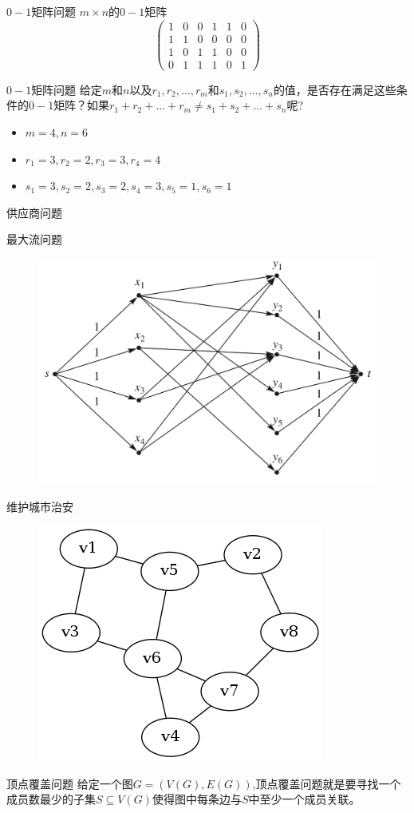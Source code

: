 \documentclass[UTF8]{ctexbeamer}
\begin{document}
\begin{frame}{$0-1$矩阵问题}
  $m \times n$的$0-1$矩阵
  \[
  \left(\begin{array}{cccccc}
    1 & 0 & 0 & 1 & 1 & 0\\
    1 & 1 & 0 & 0 & 0 & 0\\
    1 & 0 & 1 & 1 & 0 & 0\\
    0 & 1 & 1 & 1 & 0 & 1
  \end{array}\right)
  \]
  \begin{block}{$0-1$矩阵问题}
    给定$m$和$n$以及$r_1, r_2,...,r_m$和$s_1, s_2, ..., s_n$的值，是否存在满足这些条件的$0-1$矩阵？如果$r_1+r_2+...+r_m \neq s_1 + s_2 +...+s_n$呢?
  \end{block}

  \begin{itemize}
  \item $m=4, n=6$
  \item $r_1=3, r_2=2, r_3=3, r_4=4$
  \item $s_1=3, s_2=2, s_3=2, s_4=3, s_5=1, s_6=1$
  \end{itemize}
\end{frame}

\begin{frame}{供应商问题}

  最大流问题

  \begin{figure}
    \centering
    \includegraphics[width=.6\textwidth]{maxflow.png}
  \end{figure}
\end{frame}

\begin{frame}{维护城市治安}
  \begin{figure}
    \centering
    \includegraphics[width=.4\textwidth]{vertexcover.png}
  \end{figure}

  \begin{block}{顶点覆盖问题}
    给定一个图$G=(V(G), E(G))$,顶点覆盖问题就是要寻找一个成员数最少的子集$S \subseteq V(G)$使得图中每条边与$S$中至少一个成员关联。
  \end{block}

\end{frame}
\end{document}
